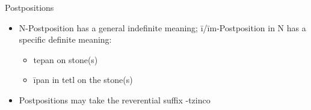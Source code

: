 \documentclass[12pt]{beamer}
\newcommand{\nah}[1]{\textcolor{nahgrn}{#1}}
\newcommand{\trs}[1]{\textcolor{nahblu}{#1}}
\begin{document}
\begin{frame}
\begin{columns}[t]
\begin{column}{.23\linewidth}
\begin{block}{Postpositions}
\begin{itemize}
          \item N-Postposition has a general indefinite meaning; \nah{ī/īm}-Postposition \nah{in} N has a specific definite meaning:
                \begin{itemize}
                  \item \nah{tepan} \trs{on stone(s)}
                  \item \nah{īpan in tetl} \trs{on the stone(s)}
                \end{itemize}
          \item Postpositions may take the reverential suffix \nah{-tzinco}
        \end{itemize}
      \end{block}
    \end{column}
  \end{columns}
\end{frame}
\end{document}
